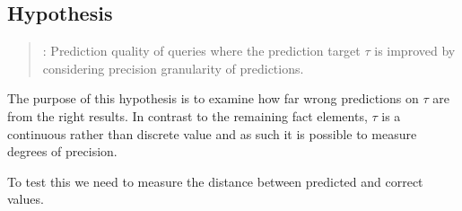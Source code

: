 \addtocounter{hcounter}{1}
\subsection{Hypothesis \thehcounter} %
\label{sec:hypothesis_\thehcounter}

\begin{quote}
:
Prediction quality of queries where the prediction target $\tau$ is improved by considering precision granularity of predictions.
\end{quote}

The purpose of this hypothesis is to examine how far wrong predictions on $\tau$ are from the right results. 
In contrast to the remaining fact elements, $\tau$ is a continuous rather than discrete value and as such it is possible to measure degrees of precision.

To test this we need to measure the distance between predicted and correct values.
